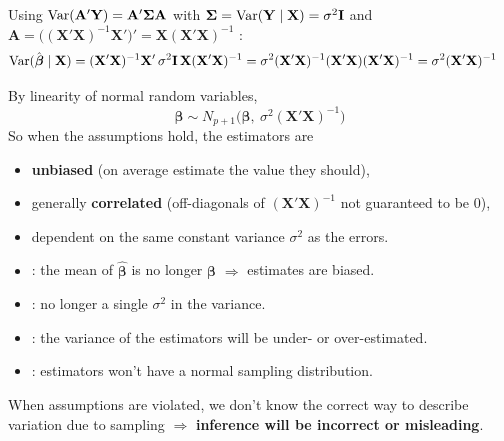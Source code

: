 \begin{proposition}
    Using $\operatorname{Var}(\mathbf{A}'\mathbf{Y})=\mathbf{A}'\boldsymbol\Sigma\mathbf{A}$ with
    $\boldsymbol\Sigma=\operatorname{Var}(\mathbf{Y}\mid\mathbf{X})=\sigma^2\mathbf{I}$ and
    $\mathbf{A}=\big((\mathbf{X}'\mathbf{X})^{-1}\mathbf{X}'\big)'=\mathbf{X}(\mathbf{X}'\mathbf{X})^{-1}$
    :
    \begin{align*}
        \operatorname{Var}(\hat{\boldsymbol\beta}\mid\mathbf{X})
        &=(\mathbf{X}'\mathbf{X})^{-1}\mathbf{X}'\,\sigma^2\mathbf{I}\,\mathbf{X}(\mathbf{X}'\mathbf{X})^{-1}
        =\sigma^2(\mathbf{X}'\mathbf{X})^{-1}(\mathbf{X}'\mathbf{X})(\mathbf{X}'\mathbf{X})^{-1}
        =\sigma^2(\mathbf{X}'\mathbf{X})^{-1}
    \end{align*}
\end{proposition}

\begin{theorem}
    By linearity of normal random variables,
    \[\boxed{\hat{\boldsymbol\beta}\sim N_{p+1}\big(\boldsymbol\beta,\ \sigma^2(\mathbf{X}'\mathbf{X})^{-1}\big)}\]
    So when the assumptions hold, the estimators are
    \begin{itemize}
        \item \textbf{unbiased} (on average estimate the value they should),
        \item generally \textbf{correlated} (off-diagonals of $(\mathbf{X}'\mathbf{X})^{-1}$ not guaranteed to be 0),
        \item dependent on the same constant variance $\sigma^2$ as the errors.
    \end{itemize}
\end{theorem}

\begin{itemize}
    \item {}: the mean of $\hat{\boldsymbol\beta}$ is no longer $\boldsymbol\beta$ $\Rightarrow$ estimates are biased.
    \item {}: no longer a single $\sigma^2$ in the variance.
    \item {}: the variance of the estimators will be under- or over-estimated.
    \item {}: estimators won't have a normal sampling distribution.
\end{itemize}
When assumptions are violated, we don't know the correct way to describe variation
due to sampling $\Rightarrow$ \textbf{inference will be incorrect or misleading}.


